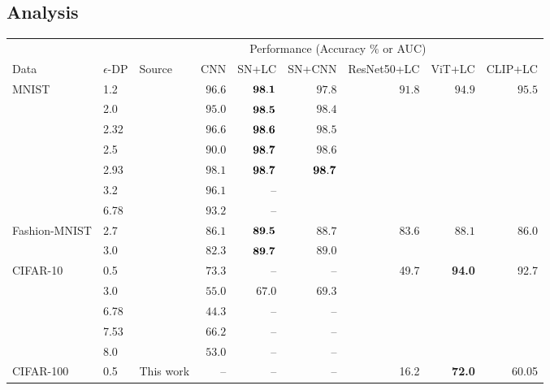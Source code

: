 \documentclass{article}
\theoremstyle{definition}
\begin{document}
\subsection{Analysis}
\begin{table}[ht!]
	\centering
	\footnotesize
	\begin{tabular}{@{} l l l r r r r r r@{}}
		& & & \multicolumn{5}{c}{Performance (Accuracy $\%$ or AUC)}\\
		\cmidrule{4-9}
		Data & $\epsilon$-DP & Source & CNN & SN+LC & SN+CNN & ResNet50+LC & ViT+LC & CLIP+LC \\
		\toprule
				
		\multirow{7}{5em}{MNIST}
		&1.2 & \citet{feldman2020individual} & $96.6$ & $\bf{98.1}$ & $97.8$ & $91.8$ & $94.9$ & $95.5$ \\
		&2.0 & \citet{abadi2016deep} & $95.0$ & $\bf{98.5}$ & $98.4$\\
		&2.32 & \citet{bu2020deep} & $96.6$ & $\bf{98.6}$ & $98.5$\\
		&2.5 & \citet{chen2020stochastic} & $90.0$ & $\bf{98.7}$ & $98.6$\\
		&2.93 & \citet{papernot2020making} &$98.1$ & $\bf{98.7}$ & $\bf{98.7}$\\
		&3.2 & \citet{nasr2020improving} & $96.1$ & -- \\ %
		&6.78 & \citet{yu2019differentially} & $93.2$ & --\\%
		\midrule

		\multirow{2}{5em}{Fashion-MNIST}
		&2.7 & \citet{papernot2020making} &$86.1$ & $\bf{89.5}$ & $88.7$ & $83.6$ & $88.1$ & $86.0$\\
		&3.0 & \citet{chen2020stochastic} & $82.3$ & $\bf{89.7}$ & $89.0$ \\
		\midrule
		
		\multirow{4}{5em}{CIFAR-10}
		&0.5 & \citet{luo2021scalable} & $73.3$ & -- & -- & 49.7 & \bf{94.0} & 92.7 \\
		&3.0 & \citet{nasr2020improving} & $55.0$ & ${67.0}$ & $69.3$\\
		&6.78 & \citet{yu2019differentially} & $44.3$ & -- &--\\ %
		&7.53 & \citet{papernot2020making} &$66.2$ & -- & --\\ %
		&8.0 & \citet{chen2020stochastic} & $53.0$ & -- & --\\
		\midrule
		
		\multirow{1}{5em}{CIFAR-100}
		&0.5 & This work & -- & -- & -- & 16.2 & \bf{72.0} & 60.05 \\
        \midrule
		

\end{tabular}
\end{table}
\end{document}
